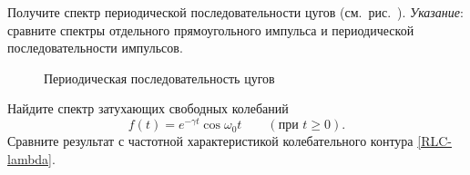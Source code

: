 \begin{lab:exercise}
Получите спектр периодической последовательности цугов (см.~рис.~).
\emph{Указание}: сравните спектры отдельного прямоугольного импульса и 
периодической последовательности импульсов.
\end{lab:exercise}

\begin{figure}[h!]
 \centering
    \caption{Периодическая последовательность цугов}
\end{figure}

\begin{lab:exercise}
   Найдите спектр затухающих свободных колебаний
    \begin{equation*}
    f(t) = e^{-\gamma t} \cos \omega_0 t\qquad (\text{при~}t\ge 0).
    \end{equation*}
Сравните результат 
с частотной характеристикой колебательного контура \eqref{RLC-lambda}.
\end{lab:exercise}

%




